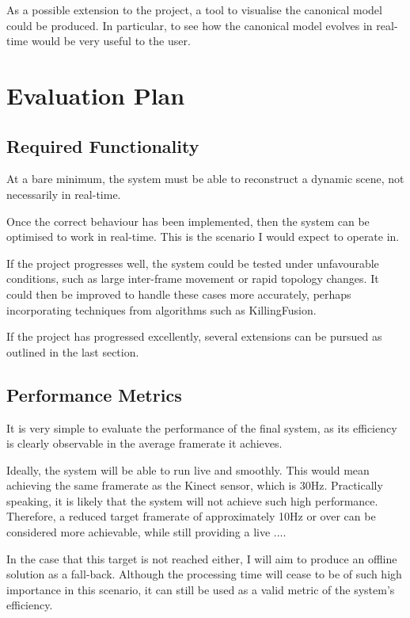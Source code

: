 \documentclass[a4paper]{article}
\begin{document}
As a possible extension to the project, a tool to visualise the canonical model could be produced. In particular, to see how the canonical model evolves in real-time would be very useful to the user.


\section{Evaluation Plan}
\subsection{Required Functionality}

At a bare minimum, the system must be able to reconstruct a dynamic scene, not necessarily in real-time. 

Once the correct behaviour has been implemented, then the system can be optimised to work in real-time. This is the scenario I would expect to operate in.

If the project progresses well, the system could be tested under unfavourable conditions, such as large inter-frame movement or rapid topology changes. It could then be improved to handle these cases more accurately, perhaps incorporating techniques from algorithms such as KillingFusion.

If the project has progressed excellently, several extensions can be pursued as outlined in the last section.


\subsection{Performance Metrics}

It is very simple to evaluate the performance of the final system, as its efficiency is clearly observable in the average framerate it achieves.

Ideally, the system will be able to run live and smoothly. This would mean achieving the same framerate as the Kinect sensor, which is 30Hz.  Practically speaking, it is likely that the system will not achieve such high performance. Therefore, a reduced target framerate of approximately 10Hz or over can be considered more achievable, while still providing a live ....

In the case that this target is not reached either, I will aim to produce an offline solution as a fall-back. Although the processing time will cease to be of such high importance in this scenario, it can still be used as a valid metric of the system's efficiency.




\end{document}
